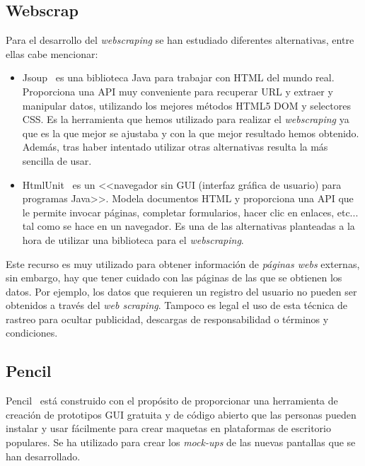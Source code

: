 \subsection{Webscrap}
Para el desarrollo del \emph{webscraping} se han estudiado diferentes alternativas, entre ellas cabe mencionar:
\begin{itemize}
	
\item Jsoup~\cite{jsoup} es una biblioteca Java para trabajar con HTML del mundo real. Proporciona una API muy conveniente para recuperar URL y extraer y manipular datos, utilizando los mejores métodos HTML5 DOM y selectores CSS. 
Es la herramienta que hemos utilizado para realizar el \emph{webscraping} ya que es la que mejor se ajustaba y con la que mejor resultado hemos obtenido. Además, tras haber intentado utilizar otras alternativas resulta la más sencilla de usar.


\item HtmlUnit~\cite{HTMLUNIT} es un <<navegador sin GUI (interfaz gráfica de usuario) para programas Java>>. Modela documentos HTML y proporciona una API que le permite invocar páginas, completar formularios, hacer clic en enlaces, etc... tal como se hace en un navegador. 
Es una de las alternativas planteadas a la hora de utilizar una biblioteca para el \emph{webscraping}.

\end{itemize}
Este recurso es muy utilizado para obtener información de \emph{páginas webs} externas, sin embargo, hay que tener cuidado con las páginas de las que se obtienen los datos. Por ejemplo, los datos que requieren un registro del usuario no pueden ser obtenidos a través del \emph{web scraping}.
Tampoco es legal el uso de esta técnica de rastreo para ocultar publicidad, descargas de responsabilidad o términos y condiciones.~\cite{webScrap}

\subsection{Pencil}
Pencil~\cite{Pencil_project} está construido con el propósito de proporcionar una herramienta de creación de prototipos GUI gratuita y de código abierto que las personas pueden instalar y usar fácilmente para crear maquetas en plataformas de escritorio populares. 
Se ha utilizado para crear los \emph{mock-ups} de las nuevas pantallas que se han desarrollado.

